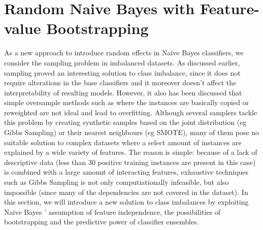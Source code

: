 \section{Random Naive Bayes with Feature-value Bootstrapping}
As a new approach to introduce random effects in Naive Bayes classifiers, we consider the sampling problem in imbalanced datasets. As discussed earlier, sampling proved an interesting solution to class imbalance, since it does not require alterations in the base classifiers and it moreover doesn't affect the interpretability of resulting models. However, it also has been discussed that simple oversample methods such as where the instances are basically copied or reweighted are not ideal and lead to overfitting. Although several samplers tackle this problem by creating synthetic samples based on the joint distribution (eg Gibbs Sampling) or their nearest neighbours (eg SMOTE), many of them pose no suitable solution to complex datasets where a select amount of instances are explained by a wide variety of features. The reason is simple: because of a lack of descriptive data (less than 30 positive training instances are present in this case) is combined with a large amount of interacting features, exhaustive techniques such as Gibbs Sampling is not only computiationally infeasible, but also impossible (since many of the dependencies are not covered in the dataset). In this section, we will introduce a new solution to class imbalances by exploiting Naive Bayes ' assumption of feature independence, the possibilities of bootstrapping and the predictive power of classifier ensembles.

